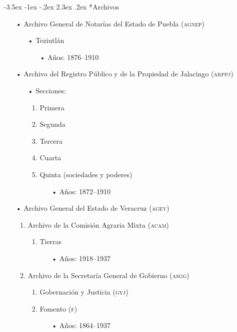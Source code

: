 \documentclass[14pt,twoside,final]{extbook} %
\makeatletter
\renewcommand\section{\@startsection {section}{1}{\z@}%
                                     {-3.5ex \@plus -1ex \@minus -.2ex}%
                                     {2.3ex \@plus .2ex}%
                                     {\normalfont\large\bfseries\sc}}
\makeatother
\begin{document}
\section*{Archivos}
\label{sec:archivos}
\begin{itemize}[noitemsep]
\item[•]Archivo General de Notarías del Estado de Puebla (\textsc{agnep})
\begin{itemize}[noitemsep]
\item[•]Teziutlán
\begin{itemize}[noitemsep]
\item[•]Años: 1876--1910
\end{itemize}
\end{itemize}
\end{itemize}
\begin{itemize}[noitemsep]
\item[•]Archivo del Registro Público y de la Propiedad de Jalacingo (\textsc{arppj})
\begin{itemize}[noitemsep]
\item[•]Secciones:
\begin{enumerate}[noitemsep]
\item Primera
\item Segunda
\item Tercera
\item Cuarta
\item Quinta (sociedades y poderes)
\begin{itemize}[noitemsep]
\item[•]Años: 1872--1910
\end{itemize}
\end{enumerate}
\end{itemize}
\end{itemize}
\begin{itemize}[noitemsep]
\item[•]Archivo General del Estado de Veracruz (\textsc{agev})
\begin{enumerate}[noitemsep]
\item Archivo de la Comisión Agraria Mixta (\textsc{acam})
\begin{enumerate}[noitemsep]
\item Tierras
\begin{itemize}[noitemsep]
\item[•]Años: 1918--1937
\end{itemize}
\end{enumerate}
\item Archivo de la Secretaría General de Gobierno (\textsc{asgg})
\begin{enumerate}[noitemsep]
\item Gobernación y Justicia (\textsc{gyj})
\item Fomento (\textsc{f})
\begin{itemize}[noitemsep]
\item[•]Años: 1864--1937
\end{itemize}
\end{enumerate}
\end{enumerate}
\end{itemize}
\end{document}
